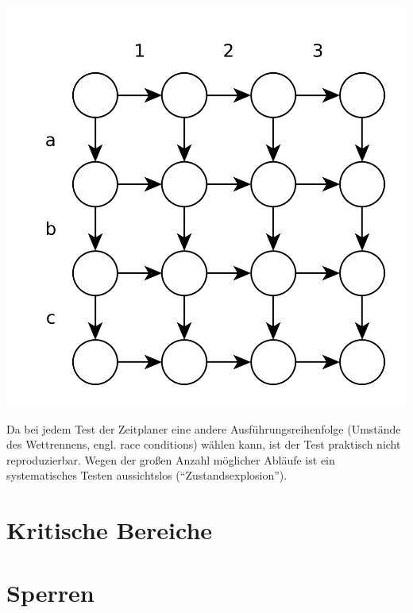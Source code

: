 \includegraphics[width=.4\textwidth]{Nondeterminism}

Da bei jedem Test der Zeitplaner eine andere Ausführungsreihenfolge (Umstände des Wettrennens, engl. race conditions) wählen kann, ist der Test praktisch nicht reproduzierbar. Wegen der großen Anzahl möglicher Abläufe ist ein systematisches Testen aussichtslos ("`Zustandsexplosion"').

\section{Kritische Bereiche}

\section{Sperren}